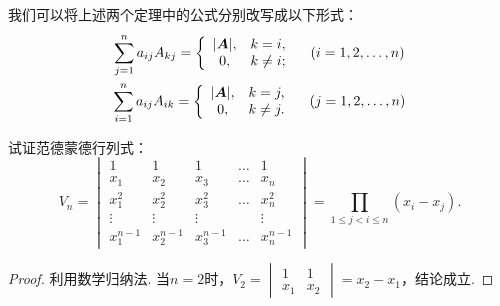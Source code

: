 我们可以将上述两个定理中的公式分别改写成以下形式：
\begin{gather}
	\sum\limits_{j=1}^n a_{ij} A_{kj} = \left\{ \begin{array}{cl}
		\abs{\A}, & k = i, \\
		0, & k \neq i;
	\end{array} \right.
	\quad(i=1,2,\dotsc,n) \\%
	\sum\limits_{i=1}^n a_{ij} A_{ik} = \left\{ \begin{array}{cl}
		\abs{\A}, & k = j, \\
		0, & k \neq j.
	\end{array} \right.
	\quad(j=1,2,\dotsc,n)
\end{gather}

\begin{example}
试证范德蒙德行列式：
\begin{equation}\label{equation:行列式.范德蒙德行列式}
	V_n = \begin{vmatrix}
		1 & 1 & 1 & \dots & 1 \\
		x_1 & x_2 & x_3 & \dots & x_n \\
		x_1^2 & x_2^2 & x_3^2 & \dots & x_n^2 \\
		\vdots & \vdots & \vdots& & \vdots \\
		x_1^{n-1} & x_2^{n-1} & x_3^{n-1} & \dots & x_n^{n-1}
	\end{vmatrix}
	= \prod\limits_{1 \leq j < i \leq n}(x_i-x_j).
\end{equation}
\begin{proof}
利用数学归纳法.
当\(n=2\)时，\(V_2 = \begin{vmatrix}
	1 & 1 \\ x_1 & x_2
\end{vmatrix} = x_2 - x_1\)，结论成立.


\end{proof}
\end{example}
